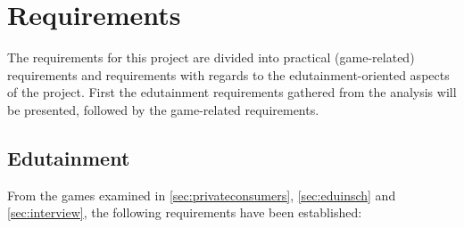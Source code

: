 \section{Requirements}
\label{sec:requirements}

The requirements for this project are divided into practical (game-related) requirements and requirements with regards to the edutainment-oriented 
aspects of the project. First the edutainment requirements gathered from the analysis will be presented, followed by the game-related requirements.

\subsection{Edutainment}

From the games examined in \autoref{sec:privateconsumers}, \autoref{sec:eduinsch} and \autoref{sec:interview}, the following requirements have been 
established: 

